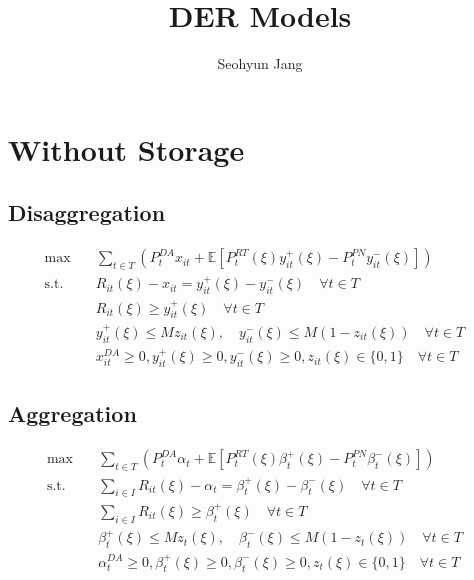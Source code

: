 \documentclass[10pt]{article}
\title{DER Models}
\author{Seohyun Jang}
\begin{document}
\maketitle

\section{Without Storage}
\subsection{Disaggregation}
\begin{subequations}
\begin{align}
    \text{max} \quad & \sum_{t\in T}\left(P_t^{DA}x_{it} + \mathbb{E}\left[P_t^{RT}(\xi)y_{it}^{+}(\xi) - P_t^{PN}y_{it}^{-}(\xi)\right]\right) &\\
    \text{s.t.} \quad & R_{it}(\xi) - x_{it} = y_{it}^{+}(\xi) - y_{it}^{-}(\xi) \quad  \forall t \in T &\\
    & R_{it}(\xi) \geq y^+_{it}(\xi) \quad \forall t \in T &\\
    & y_{it}^{+}(\xi) \leq M z_{it}(\xi), \quad y_{it}^{-}(\xi) \leq M (1 - z_{it}(\xi)) \quad \forall t \in T &\\
    & x_{it}^{DA} \geq 0, y_{it}^{+}(\xi) \geq 0, y_{it}^{-}(\xi) \geq 0, z_{it}(\xi) \in \{0, 1\} \quad \forall t \in T
\end{align}
\end{subequations}

\subsection{Aggregation}
\begin{subequations}
\begin{align}
    \text{max} \quad &\sum_{t\in T}\left(P_t^{DA}\alpha_{t} + \mathbb{E}\left[P_t^{RT}(\xi)\beta_{t}^{+}(\xi) - P_t^{PN}\beta_{t}^{-}(\xi)\right]\right) &\\
    \text{s.t.} \quad &\sum_{i\in I}R_{it}(\xi) - \alpha_{t} = \beta_{t}^{+}(\xi) - \beta_{t}^{-}(\xi) \quad \forall t \in T &\\
    & \sum_{i\in I}R_{it}(\xi) \geq \beta^+_{t}(\xi) \quad \forall t \in T &\\
    & \beta_{t}^{+}(\xi) \leq M z_{t}(\xi), \quad \beta_{t}^{-}(\xi) \leq M (1 - z_{t}(\xi)) \quad \forall t\in T &\\
    & \alpha_{t}^{DA} \geq 0, \beta_{t}^{+}(\xi) \geq 0, \beta_{t}^{-}(\xi) \geq 0, z_{t}(\xi) \in \{0, 1\} \quad \forall t\in T 
\end{align}
\end{subequations}
\end{document}
